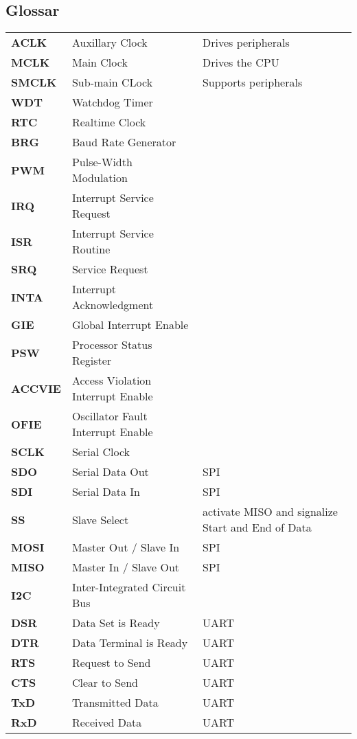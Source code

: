 \subsection*{Glossar}
\begin{tabular}{>{\bfseries}lll}
    ACLK    & Auxillary Clock   & Drives peripherals\\
    MCLK    & Main Clock        & Drives the CPU \\
    SMCLK   & Sub-main CLock    & Supports peripherals\\
    WDT     & Watchdog Timer    & \\
    RTC     & Realtime Clock    & \\
    BRG     & Baud Rate Generator& \\
    PWM     & Pulse-Width Modulation& \\
    IRQ     & Interrupt Service Request& \\
    ISR     & Interrupt Service Routine& \\
    SRQ     & Service Request   & \\
    INTA    & Interrupt Acknowledgment& \\
    GIE     & Global Interrupt Enable & \\
    PSW     & Processor Status Register & \\
    ACCVIE  & Access Violation Interrupt Enable & \\
    OFIE    & Oscillator Fault Interrupt Enable & \\
    SCLK    & Serial Clock      & \\
    SDO     & Serial Data Out   & SPI\\
    SDI     & Serial Data In    & SPI\\
    SS      & Slave Select      & activate MISO and signalize Start and End of Data\\
    MOSI    & Master Out / Slave In & SPI\\
    MISO    & Master In / Slave Out & SPI\\
    I2C     & Inter-Integrated Circuit Bus & \\
    DSR     & Data Set is Ready & UART\\
    DTR     & Data Terminal is Ready & UART\\
    RTS     & Request to Send   & UART\\
    CTS     & Clear to Send     & UART\\
    TxD     & Transmitted Data  & UART\\
    RxD     & Received Data     & UART\\

\end{tabular}
